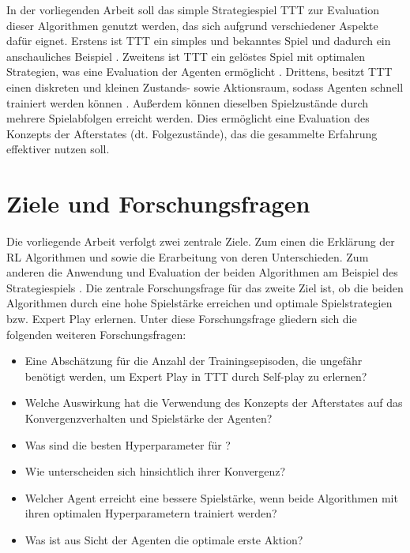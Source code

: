 In der vorliegenden Arbeit soll das simple Strategiespiel \ac{TTT} zur Evaluation dieser Algorithmen genutzt werden, das sich aufgrund verschiedener Aspekte dafür eignet. 
Erstens ist \ac{TTT} ein simples und bekanntes Spiel und dadurch ein anschauliches Beispiel \cite[S. 6]{allisSearchingSolutionsGames1994}. 
Zweitens ist \ac{TTT} ein gelöstes Spiel mit optimalen Strategien, was eine Evaluation der Agenten ermöglicht \cite[S. 533ff.]{crowleyFlexibleStrategyUse1993}.
Drittens, besitzt \ac{TTT} einen diskreten und kleinen Zustands- sowie Aktionsraum, sodass Agenten schnell trainiert werden können \cite[S. 3]{block-berlitzm.ProInformatikFunktionaleProgrammierung2009}. 
Außerdem können dieselben Spielzustände durch mehrere Spielabfolgen erreicht werden. 
Dies ermöglicht eine Evaluation des Konzepts der Afterstates (dt. Folgezustände), das die gesammelte Erfahrung effektiver nutzen soll. \cite[S. 136f.]{suttonReinforcementLearningIntroduction2018}

\section{Ziele und Forschungsfragen}
\label{sec:forschungsfragen}
Die vorliegende Arbeit verfolgt zwei zentrale Ziele. Zum einen die Erklärung der \ac{RL} Algorithmen \qlearning und \sarsa sowie die Erarbeitung von deren Unterschieden.
Zum anderen die Anwendung und Evaluation der beiden Algorithmen am Beispiel des  Strategiespiels \ttt. 
Die zentrale Forschungsfrage für das zweite Ziel ist, ob die beiden Algorithmen durch \splay eine hohe Spielstärke erreichen und optimale Spielstrategien bzw. Expert Play erlernen.
Unter diese Forschungsfrage gliedern sich die folgenden weiteren Forschungsfragen:
\begin{itemize}
    \item Eine Abschätzung für die Anzahl der Trainingsepisoden, die  ungefähr benötigt werden, um Expert Play in \ac{TTT} durch Self-play zu erlernen?
    \item Welche Auswirkung hat die Verwendung des Konzepts der Afterstates auf das Konvergenzverhalten und Spielstärke der Agenten?
    \item Was sind die besten Hyperparameter für \bothAlgs?
    \item Wie unterscheiden sich \bothAlgs hinsichtlich ihrer Konvergenz?
    \item Welcher Agent erreicht eine bessere Spielstärke, wenn beide Algorithmen mit ihren optimalen Hyperparametern trainiert werden?
    \item Was ist aus Sicht der Agenten die optimale erste Aktion?
\end{itemize}

